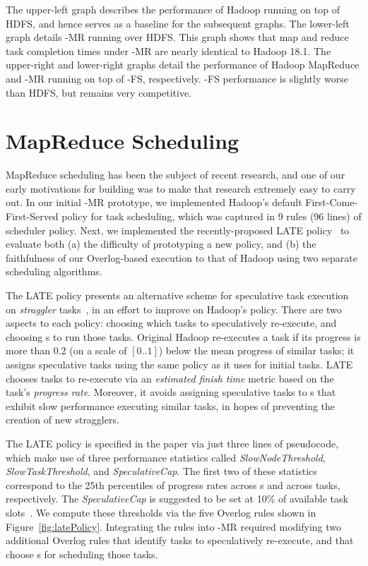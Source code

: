 The upper-left graph describes the performance of Hadoop running on
top of HDFS, and hence serves as a baseline for the subsequent
graphs. The lower-left graph details \BOOM-MR running over HDFS. This
graph shows that map and reduce task completion times under \BOOM-MR
are nearly identical to Hadoop 18.1. The upper-right and lower-right
graphs detail the performance of Hadoop MapReduce and \BOOM-MR running
on top of \BOOM-FS, respectively. \BOOM-FS performance is slightly
worse than HDFS, but remains very competitive.

\section{MapReduce Scheduling}
\label{sec:scheduling}
MapReduce scheduling has been the subject of recent research, and one
of our early motivations for building \BOOMA was to make that research
extremely easy to carry out. In our initial \BOOM-MR prototype, we
implemented Hadoop's default First-Come-First-Served policy for task
scheduling, which was captured in 9 rules (96 lines) of scheduler
policy. Next, we implemented the recently-proposed LATE
policy~\cite{late-sched} to evaluate both (a) the difficulty of
prototyping a new policy, and (b) the faithfulness of our
Overlog-based execution to that of Hadoop using two separate
scheduling algorithms.

The LATE policy presents an alternative scheme for speculative task
execution on {\em straggler} tasks~\cite{late-sched}, in an effort to
improve on Hadoop's policy.  There are two aspects to each policy:
choosing which tasks to speculatively re-execute, and choosing {\TT}s
to run those tasks.  Original Hadoop re-executes a task if its
progress is more than 0.2 (on a scale of $[0..1]$) below the mean
progress of similar tasks; it assigns speculative tasks using the same
policy as it uses for initial tasks. LATE chooses tasks to re-execute
via an {\em estimated finish time} metric based on the task's
\emph{progress rate}. Moreover, it avoids assigning speculative tasks
to {\TT}s that exhibit slow performance executing similar tasks, in
hopes of preventing the creation of new stragglers.

The LATE policy is specified in the paper via just three lines of
pseudocode, which make use of three performance statistics called {\em
  SlowNodeThreshold}, {\em SlowTaskThreshold}, and {\em
  SpeculativeCap}.  The first two of these statistics correspond to
the 25th percentiles of progress rates across {\TT}s and across tasks,
respectively.  The {\em SpeculativeCap} is suggested to be set at 10\%
of available task slots~\cite{late-sched}.  We compute these
thresholds via the five Overlog rules shown in
Figure~\ref{fig:latePolicy}.  Integrating the rules into \BOOM-MR
required modifying two additional Overlog rules that identify tasks to
speculatively re-execute, and that choose {\TT}s for scheduling those
tasks.

